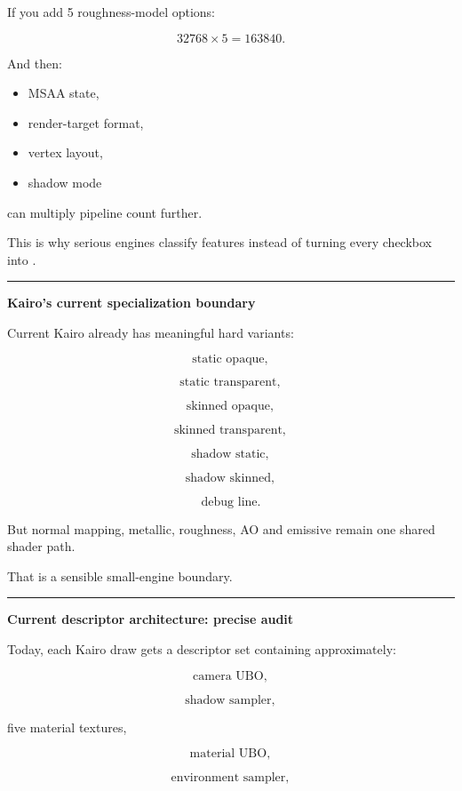 If you add 5 roughness-model options:

\[
32768\times5
=
163840.
\]

And then:

\begin{itemize}
\tightlist
\item
  MSAA state,
\item
  render-target format,
\item
  vertex layout,
\item
  shadow mode
\end{itemize}

can multiply pipeline count further.

This is why serious engines classify features instead of turning every checkbox into .

\begin{center}\rule{0.5\linewidth}{0.5pt}\end{center}

\textbf{Kairo's current specialization boundary}

Current Kairo already has meaningful hard variants:

\[
\text{static opaque},
\]

\[
\text{static transparent},
\]

\[
\text{skinned opaque},
\]

\[
\text{skinned transparent},
\]

\[
\text{shadow static},
\]

\[
\text{shadow skinned},
\]

\[
\text{debug line}.
\]

But normal mapping, metallic, roughness, AO and emissive remain one shared shader path.

That is a sensible small-engine boundary.

\begin{center}\rule{0.5\linewidth}{0.5pt}\end{center}

\textbf{Current descriptor architecture: precise audit}

Today, each Kairo draw gets a descriptor set containing approximately:

\[
\text{camera UBO},
\]

\[
\text{shadow sampler},
\]

five material textures,

\[
\text{material UBO},
\]

\[
\text{environment sampler},
\]


